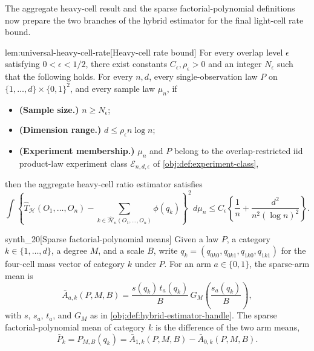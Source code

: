 The aggregate heavy-cell result and the sparse factorial-polynomial definitions now prepare the two branches of the hybrid estimator for the final light-cell rate bound.

\begin{lemmav}{lem:universal-heavy-cell-rate}[Heavy-cell rate bound]
For every overlap level \(\epsilon\) satisfying \(0<\epsilon<1/2\), there exist constants \(C_\epsilon,\rho_\epsilon>0\) and an integer \(N_\epsilon\) such that the following holds. For every \(n,d\), every single-observation law \(P\) on \(\{1,\ldots,d\}\times\{0,1\}^2\), and every sample law \(\mu_n\), if
\begin{itemize}
\item \textbf{(Sample size.)} \(n\ge N_\epsilon\);
\item \textbf{(Dimension range.)} \(d\le \rho_\epsilon n\log n\);
\item \textbf{(Experiment membership.)} \(\mu_n\) and \(P\) belong to the overlap-restricted iid product-law experiment class \(\mathcal E_{n,d,\epsilon}\) of \cref{obj:def:experiment-class},
\end{itemize}
then the aggregate heavy-cell ratio estimator satisfies
\[
\int \left\{
\widehat T_{\mathcal H}(O_1,\ldots,O_n)
-
\sum_{k\in\widehat{\mathcal H}_n(O_1,\ldots,O_n)} \phi(q_k)
\right\}^2\,d\mu_n
\le
C_\epsilon\left\{
\frac1n+\frac{d^2}{n^2(\log n)^2}
\right\}.
\]
\end{lemmav}

\begin{definitionv}{synth_20}[Sparse factorial-polynomial means]
Given a law \(P\), a category \(k\in\{1,\ldots,d\}\), a degree \(M\), and a scale \(B\), write \(q_k=(q_{0k0},q_{0k1},q_{1k0},q_{1k1})\) for the four-cell mass vector of category \(k\) under \(P\). For an arm \(a\in\{0,1\}\), the sparse-arm mean is \[ \bar A_{a,k}(P,M,B) = \frac{s(q_k)\,t_a(q_k)}{B}\,G_M\!\left(\frac{s_a(q_k)}{B}\right), \] with \(s\), \(s_a\), \(t_a\), and \(G_M\) as in \cref{obj:def:hybrid-estimator-handle}. The sparse factorial-polynomial mean of category \(k\) is the difference of the two arm means, \[ \bar P_k = P_{M,B}(q_k) = \bar A_{1,k}(P,M,B) - \bar A_{0,k}(P,M,B). \]
\end{definitionv}

